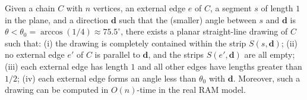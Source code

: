 \documentclass[orivec]{llncs}
\begin{document}
\begin{lemma}\label{lem:uChainEmbedding}
Given a chain $C$ with $n$ vertices, an external edge $e$ of $C$, a segment $s$ of length $1$ in the plane, and a direction $\mathbf{d}$ such that the (smaller) angle between $s$ and $\mathbf{d}$ is
$\theta < \theta_0 = \arccos(1/4) \approx 75.5^\circ$, there exists a planar straight-line drawing of $C$ such that: (i) the drawing is completely contained within the strip $S(s,\mathbf{d})$; (ii) no external edge $e'$ of $C$ is parallel to $\mathbf{d}$, and the strips $S(e',\mathbf{d})$ are all empty; (iii) each external edge has length $1$ and all other edges have lengths greater than $1/2$; (iv) each external edge forms an angle less than $\theta_0$ with  $\mathbf{d}$. Moreover, such a drawing can be computed in $O(n)$-time in the real RAM model.
\end{lemma}
\end{document}
